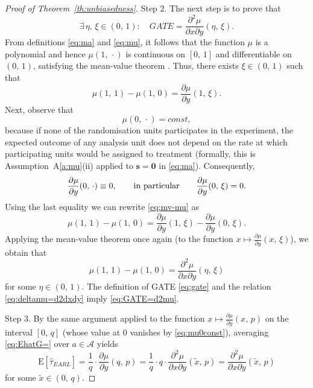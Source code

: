 \documentclass[sigconf]{acmart}
\newcommand{\E}{\mathrm E}
\begin{document}
\begin{proof}[Proof of Theorem~\ref{th:unbiasedness}]
Step 2. The next step is to prove that
\begin{equation}\label{eq:GATE=d2mu}
    \exists\,\eta,\,\xi\in(0,\,1)\colon\quad GATE = \frac{\partial^2\mu}{\partial x \partial y}(\eta,\,\xi).
\end{equation}
From definitions \eqref{eq:ma} and \eqref{eq:mu}, it follows that the function $\mu$ is a polynomial and hence $\mu(1,\,\cdot)$ is continuous on $[0,\,1]$ and differentiable on $(0,\,1)$, satisfying the mean-value theorem \cite[Theorem~5.10]{rudin1976principles}. Thus, there exists $\xi\in(0,\,1)$ such that
\begin{equation}\label{eq:mv-mu}
    \mu(1,\,1)-\mu(1,\,0) = \frac{\partial\mu}{\partial y}(1,\,\xi).
\end{equation}
Next, observe that
\begin{equation}\label{eq:mu0const}
    \mu(0,\,\cdot) = const,
\end{equation}
because if none of the randomisation units participates in the experiment, the expected outcome of any analysis unit does not depend on the rate at which participating units would be assigned to treatment (formally, this is Assumption~A\ref{a:mu}(ii) applied to $\mathbf s = \mathbf 0$ in \eqref{eq:ma}). Consequently,
\begin{equation*}
    \frac{\partial\mu}{\partial y}(0,\,\cdot) \equiv 0,\qquad\textup{in particular}\qquad
    \frac{\partial\mu}{\partial y}(0,\,\xi) = 0.
\end{equation*}
Using the last equality we can rewrite \eqref{eq:mv-mu} as
\begin{equation*}
    \mu(1,\,1)-\mu(1,\,0) = \frac{\partial\mu}{\partial y}(1,\,\xi) - \frac{\partial\mu}{\partial y}(0,\,\xi).
\end{equation*}
Applying the mean-value theorem once again (to the function $x\mapsto \frac{\partial\mu}{\partial y}(x,\,\xi)$), we obtain that
\begin{equation}\label{eq:deltamu=d2dxdy}
    \mu(1,\,1)-\mu(1,\,0) = \frac{\partial^2\mu}{\partial x\partial y}(\eta,\,\xi)
\end{equation}
for some $\eta\in(0,\,1)$. The definition of GATE \eqref{eq:gate} and the relation \eqref{eq:deltamu=d2dxdy} imply \eqref{eq:GATE=d2mu}.

Step 3. By the same argument applied to the function $x\mapsto\frac{\partial \mu}{\partial y}(x,\,p)$ on the interval $[0,\,q]$ (whose value at $0$ vanishes by \eqref{eq:mu0const}), averaging \eqref{eq:EhatG=} over $a\in\mathcal A$ yields
\begin{equation}\label{eq:EhatTau}
    \E[\hat\tau^{\phantom{1}}_{EARL}] = \frac 1q\cdot \frac{\partial\mu}{\partial y}(q,\,p) = \frac 1q \cdot q\cdot\frac{\partial^2\mu}{\partial x\partial y}(\tilde x,\,p) = \frac{\partial^2\mu}{\partial x\partial y}(\tilde x,\,p)
\end{equation}
for some $\tilde x\in(0,\,q)$.


\end{proof}
\end{document}
